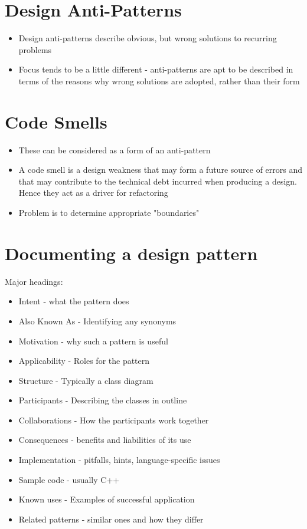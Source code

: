 \documentclass{article}[18pt]
\begin{document}
\section{Design Anti-Patterns}
\begin{itemize}
	\item Design anti-patterns describe obvious, but wrong solutions to recurring problems
	\item Focus tends to be a little different - anti-patterns are apt to be described in terms of the reasons why wrong solutions are adopted, rather than their form
\end{itemize}
\section{Code Smells}
\begin{itemize}
	\item These can be considered as a form of an anti-pattern
	\item A code smell is a design weakness that may form a future source of errors and that may contribute to the technical debt incurred when producing a design. Hence they act as a driver for refactoring
	\item Problem is to determine appropriate "boundaries"
\end{itemize}
\section{Documenting a design pattern}
Major headings:
\begin{itemize}
	\item Intent - what the pattern does
	\item Also Known As - Identifying any synonyms
	\item Motivation - why such a pattern is useful
	\item Applicability - Roles for the pattern
	\item Structure - Typically a class diagram
	\item Participants - Describing the classes in outline
	\item Collaborations - How the participants work together
	\item Consequences - benefits and liabilities of its use
	\item Implementation  - pitfalls, hints, language-specific issues
	\item Sample code - usually C++
	\item Known uses - Examples of successful application
	\item Related patterns - similar ones and how they differ
\end{itemize}
\end{document}
